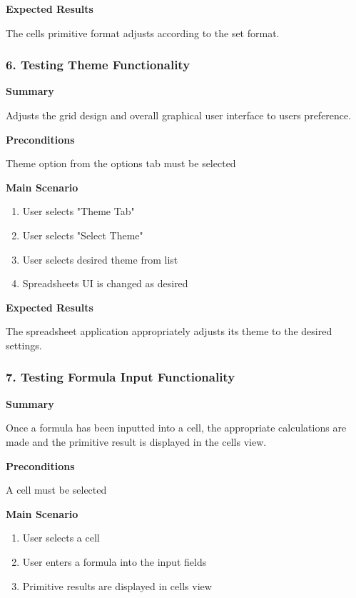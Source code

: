 \documentclass[12pt]{article}
\begin{document}
\noindent
{\bf Expected Results}

The cells primitive format adjusts according to the set format. 

\subsubsection{6. Testing Theme Functionality}

\noindent
{\bf Summary}

Adjusts the grid design and overall graphical user interface to users preference. 

\noindent
{\bf Preconditions}

Theme option from the options tab must be selected

\noindent
{\bf Main Scenario}
\begin{enumerate}
	\item User selects "Theme Tab"
	\item User selects "Select Theme"
	\item User selects desired theme from list
	\item Spreadsheets UI is changed as desired
\end{enumerate}

\noindent
{\bf Expected Results}

The spreadsheet application appropriately adjusts its theme to the desired settings. 

\subsubsection{7. Testing Formula Input Functionality}

\noindent
{\bf Summary}

Once a formula has been inputted into a cell, the appropriate calculations are made and the primitive result is displayed in the cells view.

\noindent
{\bf Preconditions}

A cell must be selected

\noindent
{\bf Main Scenario}
\begin{enumerate}
	\item User selects a cell
	\item User enters a formula into the input fields
	\item Primitive results are displayed in cells view
\end{enumerate}
\end{document}

